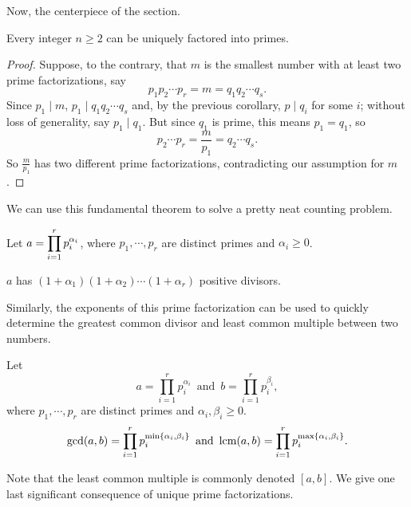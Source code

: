 \documentclass[../m55main.tex]{subfiles}
\begin{document}
Now, the centerpiece of the section.

\begin{theorem}
    Every integer $n \geq 2$ can be uniquely factored into primes.
\end{theorem}

\begin{proof}
    Suppose, to the contrary, that $m$ is the smallest number with at least two prime factorizations, say
    \[ p_1 p_2 \cdots p_r = m = q_1 q_2 \cdots q_s. \]
    Since $p_1 \mid m$, $p_1 \mid q_1 q_2 \cdots q_s$ and, by the previous corollary, $p \mid q_i$ for some $i$; without loss of generality, say $p_1 \mid q_1$.
    But since $q_1$ is prime, this means $p_1 = q_1$, so
    \[ p_2 \cdots p_r = \frac{m}{p_1} = q_2 \cdots q_s. \]
    So $\frac{m}{p_1}$ has two different prime factorizations, contradicting our assumption for $m$.
\end{proof}

We can use this fundamental theorem to solve a pretty neat counting problem.

\begin{theorem}
    Let $\displaystyle a = \prod_{i=1}^r p_i^{\alpha_i}$, where $p_1, \cdots, p_r$ are distinct primes and $\alpha_i \geq 0$.

    $a$ has $(1 + \alpha_1) (1 + \alpha_2) \cdots (1 + \alpha_r)$ positive divisors.
\end{theorem}


Similarly, the exponents of this prime factorization can be used to quickly determine the greatest common divisor and least common multiple between two numbers.

\begin{theorem}
    Let
    \[ a = \prod_{i=1}^r p_i^{\alpha_i} \,\text{ and }\, b = \prod_{i=1}^r p_i^{\beta_i}, \]
    where $p_1, \cdots, p_r$ are distinct primes and $\alpha_i, \beta_i \geq 0$.
    \[ \gcd (a,b) = \prod_{i=1}^r p_i^{\min \left\{ \alpha_i, \beta_i \right\}} \,\text{ and }\, \textrm{lcm} (a,b) = \prod_{i=1}^r p_i^{\max \left\{ \alpha_i, \beta_i \right\}}. \]
\end{theorem}


Note that the least common multiple is commonly denoted $[a,b]$.
We give one last significant consequence of unique prime factorizations.
\end{document}
